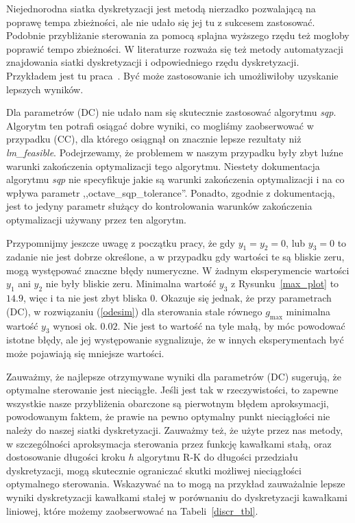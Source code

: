 \documentclass[licencjacka]{pracamgr}
\begin{document}
Niejednorodna siatka dyskretyzacji jest metodą nierzadko pozwalającą na poprawę tempa zbieżności, ale nie udało się jej tu z sukcesem zastosować. Podobnie przybliżanie sterowania za pomocą splajna wyższego rzędu też mogłoby poprawić tempo zbieżności. W literaturze rozważa się też metody automatyzacji znajdowania siatki dyskretyzacji i odpowiedniego rzędu dyskretyzacji. Przykładem jest tu praca~\cite{Rao-ph}. Być może zastosowanie ich umożliwiłoby uzyskanie lepszych wyników.

Dla parametrów (DC) nie udało nam się skutecznie zastosować algorytmu {\it sqp}. Algorytm ten potrafi osiągać dobre wyniki, co mogliśmy zaobserwować w przypadku (CC), dla którego osiągnął on znacznie lepsze rezultaty niż {\it lm\_feasible}. Podejrzewamy, że problemem w naszym przypadku były zbyt luźne warunki zakończenia optymalizacji tego algorytmu.  Niestety dokumentacja algorytmu {\it sqp\/}  nie specyfikuje jakie są warunki zakończenia optymalizacji i na co wpływa parametr ,,octave\_sqp\_tolerance''. Ponadto, zgodnie z dokumentacją, jest to jedyny parametr służący do kontrolowania warunków zakończenia optymalizacji używany przez ten algorytm.

Przypomnijmy jeszcze uwagę z początku pracy, że gdy $y_1 = y_2 = 0$, lub $y_3 = 0$ to zadanie nie jest dobrze określone, a w przypadku gdy wartości te są bliskie zeru, mogą występować znaczne błędy numeryczne. W żadnym eksperymencie wartości $y_1$ ani $y_2$ nie były bliskie zeru. Minimalna wartość $y_3$ z Rysunku~\ref{max_plot} to $14.9$, więc i ta nie jest zbyt bliska 0. Okazuje się jednak, że przy parametrach (DC), w rozwiązaniu (\ref{odesim}) dla sterowania stale równego $g_{\max}$ minimalna wartość $y_3$ wynosi ok. $0.02$. Nie jest to wartość na tyle małą, by móc powodować istotne błędy, ale jej występowanie sygnalizuje, że w innych eksperymentach być może pojawiają się mniejsze wartości.

Zauważmy, że najlepsze otrzymywane wyniki dla parametrów (DC) sugerują, że optymalne sterowanie jest nieciągłe. Jeśli jest tak w rzeczywistości, to zapewne wszystkie nasze przybliżenia obarczone są pierwotnym błędem aproksymacji, powodowanym faktem, że prawie na pewno optymalny punkt nieciągłości nie należy do naszej siatki dyskretyzacji. Zauważmy też, że użyte przez nas metody, w szczególności aproksymacja sterowania przez funkcję kawałkami stałą, oraz dostosowanie długości kroku $h$ algorytmu R-K do długości przedziału dyskretyzacji, mogą skutecznie ograniczać skutki możliwej nieciągłości optymalnego sterowania. Wskazywać na to mogą na przykład zauważalnie lepsze wyniki dyskretyzacji kawałkami stałej w porównaniu do dyskretyzacji kawałkami liniowej, które możemy zaobserwować na Tabeli~\ref{discr_tbl}.
\end{document}
